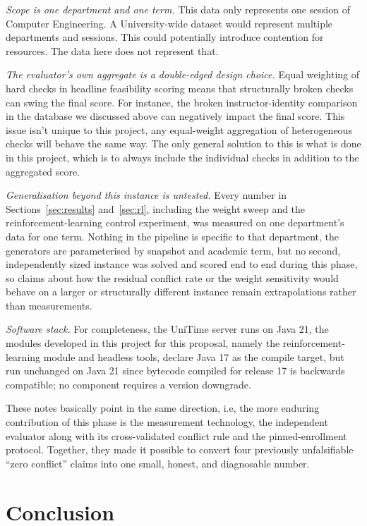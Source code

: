 \documentclass[journal]{IEEEtran}
\begin{document}
\emph{Scope is one department and one term.} This data only represents one session of Computer Engineering. A University-wide dataset would represent multiple departments and sessions. This could potentially introduce contention for resources. The data here does not represent that.

\emph{The evaluator's own aggregate is a double-edged design choice.} Equal weighting of hard checks in headline feasibility scoring means that structurally broken checks can swing the final score. For instance, the broken instructor-identity comparison in the database we discussed above can negatively impact the final score. This issue isn’t unique to this project, any equal-weight aggregation of heterogeneous checks will behave the same way. The only general solution to this is what is done in this project, which is to always include the individual checks in addition to the aggregated score.

\emph{Generalisation beyond this instance is untested.} Every number in Sections~\ref{sec:results} and~\ref{sec:rl}, including the weight sweep and the reinforcement-learning control experiment, was measured on one department's data for one term. Nothing in the pipeline is specific to that department, the generators are parameterised by snapshot and academic term, but no second, independently sized instance was solved and scored end to end during this phase, so claims about how the residual conflict rate or the weight sensitivity would behave on a larger or structurally different instance remain extrapolations rather than measurements.

\emph{Software stack.} For completeness, the UniTime server runs on Java 21, the modules developed in this project for this proposal, namely the reinforcement-learning module and headless tools, declare Java 17 as the compile target, but run unchanged on Java 21 since bytecode compiled for release 17 is backwards compatible; no component requires a version downgrade.

These notes basically point in the same direction, i.e, the more enduring contribution of this phase is the measurement technology, the independent evaluator along with its cross-validated conflict rule and the pinned-enrollment protocol. Together, they made it possible to convert four previously unfalsifiable “zero conflict” claims into one small, honest, and diagnosable number.

\section{Conclusion}
\label{sec:conclusion}
\end{document}
